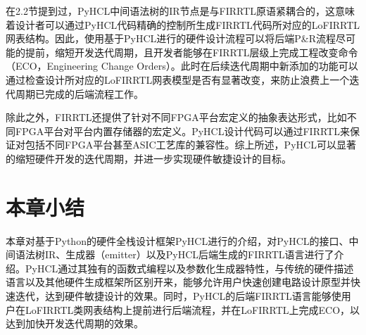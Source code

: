 在2.2节提到过，PyHCL中间语法树的IR节点是与FIRRTL原语紧耦合的，这意味着设计者可以通过PyHCL代码精确的控制所生成FIRRTL代码所对应的LoFIRRTL网表结构。因此，使用基于PyHCL进行的硬件设计流程可以将后端P\&R流程尽可能的提前，缩短开发迭代周期，且开发者能够在FIRRTL层级上完成工程改变命令（ECO，Engineering Change Orders）。此时在后续迭代周期中新添加的功能可以通过检查设计所对应的LoFIRRTL网表模型是否有显著改变，来防止浪费上一个迭代周期已完成的后端流程工作。

除此之外，FIRRTL还提供了针对不同FPGA平台宏定义的抽象表达形式，比如不同FPGA平台对平台内置存储器的宏定义。PyHCL设计代码可以通过FIRRTL来保证对包括不同FPGA平台甚至ASIC工艺库的兼容性。综上所述，PyHCL可以显著的缩短硬件开发的迭代周期，并进一步实现硬件敏捷设计的目标。

\section{本章小结}

本章对基于Python的硬件全栈设计框架PyHCL进行的介绍，对PyHCL的接口、中间语法树IR、生成器（emitter）以及PyHCL后端生成的FIRRTL语言进行了介绍。PyHCL通过其独有的函数式编程以及参数化生成器特性，与传统的硬件描述语言以及其他硬件生成框架所区别开来，能够允许用户快速创建电路设计原型并快速迭代，达到硬件敏捷设计的效果。同时，PyHCL的后端FIRRTL语言能够使用户在LoFIRRTL类网表结构上提前进行后端流程，并在LoFIRRTL上完成ECO，以达到加快开发迭代周期的效果。

